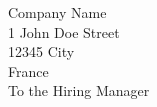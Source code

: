 
\begin{flushright}
Company Name \\
1 John Doe Street \\
12345 City \\
France \\
To the Hiring Manager \\
\end{flushright}